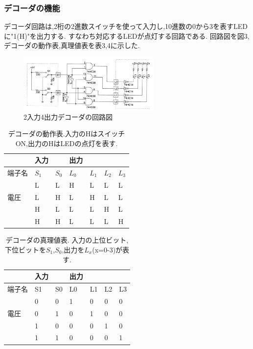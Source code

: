 \documentclass[twocolumn, 10pt,a4j]{jsarticle}
\begin{document}
  \subsubsection{デコーダの機能}
  デコーダ回路は,2桁の2進数スイッチを使って入力し,10進数の0から3を表すLEDに"1(H)"を出力する.
  すなわち対応するLEDが点灯する回路である.
  回路図を図3,デコーダの動作表,真理値表を表3,4に示した.
  \begin{figure}[H]
    \begin{center}
      \includegraphics[width=7cm]{../img/decoda/input2_decoda.png}
      \caption{2入力4出力デコーダの回路図}
    \end{center}
  \end{figure}
  \begin{table}[H]
    \centering
    \caption{デコーダの動作表.入力のHはスイッチON,出力のHはLEDの点灯を表す.}
    \label{my-label}
    \footnotesize
      \begin{tabular}{l|ll|llll}
          & 入力 &    & 出力 &    &    &    \\ \hline
      端子名 & $S_{1}$ & $S_{0}$ & $L_{0}$ & $L_{1}$ & $L_{2}$ & $L_{3}$ \\ \hline
          & L  & L  & H  & L  & L  & L  \\
      電圧  & L  & H  & L  & H  & L  & L  \\
          & H  & L  & L  & L  & H  & L  \\
          & H  & H  & L  & L  & L  & H 
      \end{tabular}
  \end{table}
  \begin{table}[H]
    \centering
    \caption{デコーダの真理値表.
    入力の上位ビット,下位ビットを$S_{1}$,$S_{0}$,出力を$L_{x}$(x=0-3)が表す.}
    \label{my-label}
    \footnotesize
      \begin{tabular}{l|ll|llll}
          & 入力 &    & 出力 &    &    &    \\ \hline
      端子名 & S1 & S0 & L0 & L1 & L2 & L3 \\ \hline
          & 0  & 0  & 1  & 0  & 0  & 0  \\
      電圧  & 0  & 1  & 0  & 1  & 0  & 0  \\
          & 1  & 0  & 0  & 0  & 1  & 0  \\
          & 1  & 1  & 0  & 0  & 0  & 1 
      \end{tabular}
  \end{table}
\end{document}

